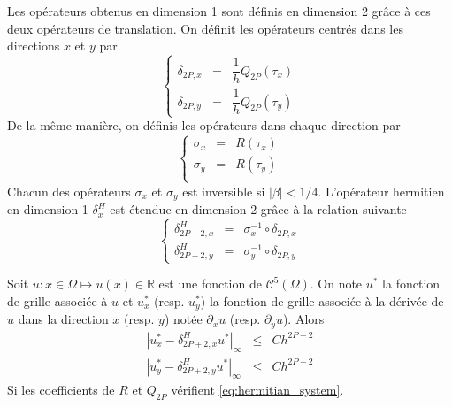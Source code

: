 Les opérateurs obtenus en dimension 1 sont définis en dimension 2 grâce à ces deux opérateurs de translation. On définit les opérateurs centrés dans les directions $x$ et $y$ par 
\begin{equation}
\left\lbrace
\begin{array}{rcl}
\delta_{2P,x} & = & \dfrac{1}{h} Q_{2P}(\tau_x) \\
\delta_{2P,y} & = & \dfrac{1}{h} Q_{2P}(\tau_y)
\end{array}
\right.
\label{eq:der_centrée_2D}
\end{equation}
De la même manière, on définis les opérateurs dans chaque direction par 
\begin{equation}
\left\lbrace
\begin{array}{rcl}
\sigma_x & = & R(\tau_x) \\
\sigma_y & = & R(\tau_y) \\
\end{array}
\right.
\label{eq:simpson_2D}
\end{equation}
Chacun des opérateurs $\sigma_x$ et $\sigma_y$ est inversible si $|\beta|<1/4$.
L'opérateur hermitien en dimension 1 $\delta_x^H$ est étendue en dimension 2 grâce à la relation suivante 
\begin{equation}
\left\lbrace
\begin{array}{rcl}
\delta_{2P+2,x}^H & = & \sigma_x^{-1} \circ \delta_{2P,x} \\
\delta_{2P+2,y}^H & = & \sigma_y^{-1} \circ \delta_{2P,y}
\end{array}
\right.
\label{eq:der_herm_2D}
\end{equation}

\begin{theoreme}
Soit $u : x \in \Omega \mapsto u(x) \in \mathbb{R}$ est une fonction de $\mathcal{C}^5 (\Omega)$. On note $u^*$ la fonction de grille associée à $u$ et $u_x^*$ (resp. $u_y^*$) la fonction de grille associée à la dérivée de $u$ dans la direction $x$ (resp. $y$) notée $\partial_x u$ (resp. $\partial_y u$). Alors
\begin{equation}
\begin{array}{rcl}
|u^*_{x} - \delta_{2P+2,x}^H u^*|_{\infty} &\leq& C h^{2P+2}\\
|u^*_{y} - \delta_{2P+2,y}^H u^*|_{\infty} &\leq& C h^{2P+2}
\end{array}
\end{equation}
Si les coefficients de $R$ et $Q_{2P}$ vérifient \eqref{eq:hermitian_system}.
\end{theoreme}

